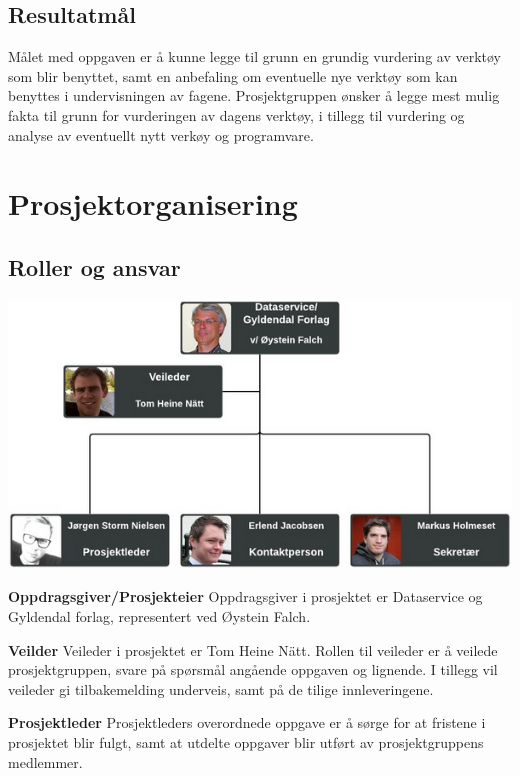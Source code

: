 \documentclass[norsk,a4paper,12pt]{article}
\begin{document}
\subsection{Resultatmål}

Målet med oppgaven er å kunne legge til grunn en grundig vurdering av verktøy som blir benyttet, samt en anbefaling om eventuelle nye verktøy som kan benyttes i undervisningen av fagene. Prosjektgruppen ønsker å legge mest mulig fakta til grunn for vurderingen av dagens verktøy, i tillegg til vurdering og analyse av eventuellt nytt verkøy og programvare.

\section{Prosjektorganisering}

\subsection{Roller og ansvar}

\includegraphics{prorg.png}

\noindent\textbf{Oppdragsgiver/Prosjekteier}\newline
Oppdragsgiver i prosjektet er Dataservice og Gyldendal forlag, representert ved Øystein Falch.
\newline

\noindent\textbf{Veilder}\newline
Veileder i prosjektet er Tom Heine Nätt. Rollen til veileder er å veilede prosjektgruppen, svare på spørsmål angående oppgaven og lignende. I tillegg vil veileder gi tilbakemelding underveis, samt på de tilige innleveringene.
\newline

\noindent\textbf{Prosjektleder}\newline
Prosjektleders overordnede oppgave er å sørge for at fristene i prosjektet blir fulgt, samt at utdelte oppgaver blir utført av prosjektgruppens medlemmer. 
\newline
\end{document}
